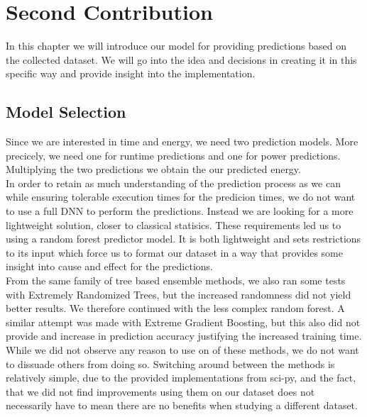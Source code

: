 \chapter{Second Contribution}\label{chap:contrib2}

In this chapter we will introduce our model for providing predictions based on the collected dataset. We will go into the idea and decisions in creating it in this specific way and provide insight into the implementation.


\section{Model Selection}
Since we are interested in time and energy, we need two prediction models. More precicely, we need one for runtime predictions and one for power predictions. Multiplying the two predictions we obtain the our predicted energy. \\
In order to retain as much understanding of the prediction process as we can while ensuring tolerable execution times for the predicion times, we do not want to use a full DNN to perform the predictions. Instead we are looking for a more lightweight solution, closer to classical statisics. These requirements led us to using a random forest predictor model. It is both lightweight and sets restrictions to its input which force us to format our dataset in a way that provides some insight into cause and effect for the predictions. \\
From the same family of tree based ensemble methods, we also ran some tests with Extremely Randomized Trees, but the increased randomness did not yield better results. We therefore continued with the less complex random forest. A similar attempt was made with Extreme Gradient Boosting, but this also did not provide and increase in prediction accuracy justifying the increased training time. While we did not observe any reason to use on of these methods, we do not want to dissuade others from doing so. Switching around between the methods is relatively simple, due to the provided implementations from sci-py, and the fact, that we did not find improvements using them on our dataset does not necessarily have to mean there are no benefits when studying a different dataset.



